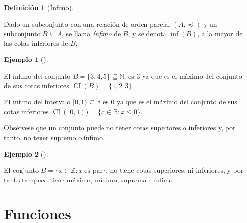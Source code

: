 \documentclass[
  a4paper,
]{scrreport}
\theoremstyle{definition}
\newtheorem{definition}{Definición}[chapter]
\theoremstyle{plain}
\theoremstyle{plain}
\theoremstyle{definition}
\theoremstyle{definition}
\newtheorem{example}{Ejemplo}[chapter]
\theoremstyle{plain}
\theoremstyle{remark}
\begin{document}
\begin{definition}[Ínfimo]\protect\hypertarget{def-infimo-conjunto}{}\label{def-infimo-conjunto}

Dado un subconjunto con una relación de orden parcial \((A,\preceq)\) y
un subconjunto \(B\subseteq A\), se llama \emph{ínfimo} de \(B\), y se
denota \(\inf(B)\), a la mayor de las cotas inferiores de \(B\).

\end{definition}

\begin{example}[]\protect\hypertarget{exm-infimo}{}\label{exm-infimo}

El ínfimo del conjunto \(B=\{3, 4, 5\}\subseteq \mathbb{N}\), es \(3\)
ya que es el máximo del conjunto de sus cotas inferiores
\(\operatorname{CI}(B)=\{1, 2, 3\}\).

El ínfimo del intervalo \([0,1)\subseteq \mathbb{R}\) es \(0\) ya que es
el máximo del conjunto de sus cotas inferiores
\(\operatorname{CI}([0,1)) = \{x\in \mathbb{R}:x\leq 0\}\).

\end{example}

\begin{tcolorbox}[enhanced jigsaw, breakable, title=\textcolor{quarto-callout-warning-color}{\faExclamationTriangle}\hspace{0.5em}{Advertencia}, toprule=.15mm, coltitle=black, arc=.35mm, rightrule=.15mm, colframe=quarto-callout-warning-color-frame, colbacktitle=quarto-callout-warning-color!10!white, toptitle=1mm, titlerule=0mm, leftrule=.75mm, opacityback=0, colback=white, bottomrule=.15mm, bottomtitle=1mm, left=2mm, opacitybacktitle=0.6]

Obsérvese que un conjunto puede no tener cotas superiores o inferiores
y, por tanto, no tener supremo o ínfimo.

\end{tcolorbox}

\begin{example}[]\protect\hypertarget{exm-no-supremo-infimio}{}\label{exm-no-supremo-infimio}

El conjunto \(B=\{x\in\mathbb{Z}: x \mbox{ es par}\}\), no tiene cotas
superiores, ni inferiores, y por tanto tampoco tiene máximo, mínimo,
supremo e ínfimo.

\end{example}

\hypertarget{funciones}{%
\section{Funciones}\label{funciones}}
\end{document}
